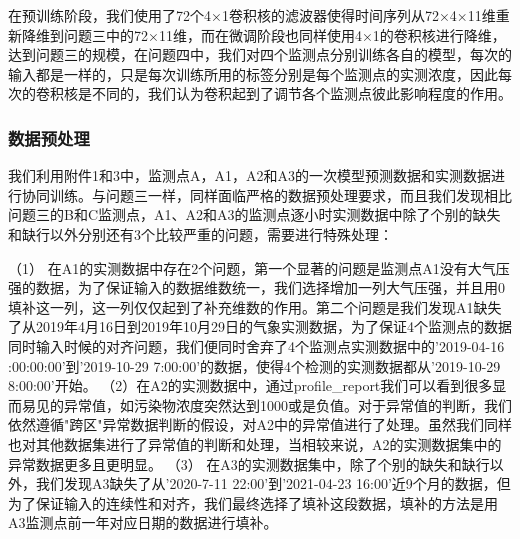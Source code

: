 \documentclass[bwprint]{gmcmthesis}
\numberwithin{figure}{section}
\begin{document}
在预训练阶段，我们使用了72个4×1卷积核的滤波器使得时间序列从72×4×11维重新降维到问题三中的72×11维，而在微调阶段也同样使用4×1的卷积核进行降维，达到问题三的规模，在问题四中，我们对四个监测点分别训练各自的模型，每次的输入都是一样的，只是每次训练所用的标签分别是每个监测点的实测浓度，因此每次的卷积核是不同的，我们认为卷积起到了调节各个监测点彼此影响程度的作用。
\subsubsection{数据预处理}
我们利用附件1和3中，监测点A，A1，A2和A3的一次模型预测数据和实测数据进行协同训练。与问题三一样，同样面临严格的数据预处理要求，而且我们发现相比问题三的B和C监测点，A1、A2和A3的监测点逐小时实测数据中除了个别的缺失和缺行以外分别还有3个比较严重的问题，需要进行特殊处理：

	（1） 在A1的实测数据中存在2个问题，第一个显著的问题是监测点A1没有大气压强的数据，为了保证输入的数据维数统一，我们选择增加一列大气压强，并且用0填补这一列，这一列仅仅起到了补充维数的作用。第二个问题是我们发现A1缺失了从2019年4月16日到2019年10月29日的气象实测数据，为了保证4个监测点的数据同时输入时候的对齐问题，我们便同时舍弃了4个监测点实测数据中的'2019-04-16 :00:00:00'到'2019-10-29 7:00:00'的数据，使得4个检测的实测数据都从'2019-10-29 8:00:00'开始。
	（2）在A2的实测数据中，通过profile\_report我们可以看到很多显而易见的异常值，如污染物浓度突然达到1000或是负值。对于异常值的判断，我们依然遵循"跨区"异常数据判断的假设，对A2中的异常值进行了处理。虽然我们同样也对其他数据集进行了异常值的判断和处理，当相较来说，A2的实测数据集中的异常数据更多且更明显。
	（3） 在A3的实测数据集中，除了个别的缺失和缺行以外，我们发现A3缺失了从'2020-7-11 22:00'到'2021-04-23 16:00'近9个月的数据，但为了保证输入的连续性和对齐，我们最终选择了填补这段数据，填补的方法是用A3监测点前一年对应日期的数据进行填补。
\end{document}
